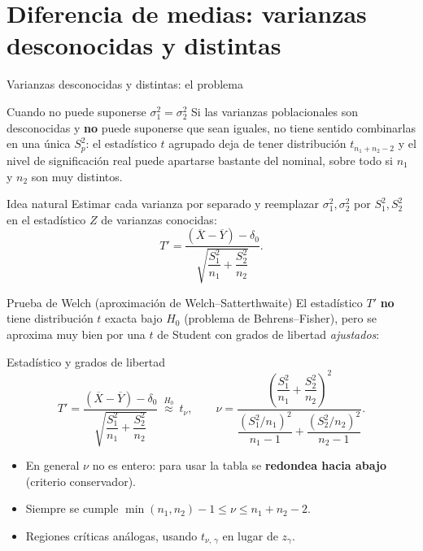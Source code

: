 \documentclass[aspectratio=169,11pt]{beamer}
\begin{document}
\section{Diferencia de medias: varianzas desconocidas y distintas}

\begin{frame}{Varianzas desconocidas y distintas: el problema}
\begin{alertblock}{Cuando no puede suponerse $\sigma_1^2=\sigma_2^2$}
Si las varianzas poblacionales son desconocidas y \textbf{no} puede suponerse que sean iguales, no tiene sentido combinarlas en una única $S_p^2$: el estadístico $t$ agrupado deja de tener distribución $t_{n_1+n_2-2}$ y el nivel de significación real puede apartarse bastante del nominal, sobre todo si $n_1$ y $n_2$ son muy distintos.
\end{alertblock}

\begin{block}{Idea natural}
Estimar cada varianza por separado y reemplazar $\sigma_1^2,\sigma_2^2$ por $S_1^2,S_2^2$ en el estadístico $Z$ de varianzas conocidas:
\[
T'=\frac{(\overline{X}-\overline{Y})-\delta_0}{\sqrt{\dfrac{S_1^2}{n_1}+\dfrac{S_2^2}{n_2}}}.
\]
\end{block}
\end{frame}

\begin{frame}{Prueba de Welch (aproximación de Welch--Satterthwaite)}
El estadístico $T'$ \textbf{no} tiene distribución $t$ exacta bajo $H_0$ (problema de Behrens--Fisher), pero se aproxima muy bien por una $t$ de Student con grados de libertad \emph{ajustados}:

\begin{block}{Estadístico y grados de libertad}
\[
T'=\frac{(\overline{X}-\overline{Y})-\delta_0}{\sqrt{\dfrac{S_1^2}{n_1}+\dfrac{S_2^2}{n_2}}} \ \overset{H_0}{\approx}\ t_{\nu},
\qquad
\nu=\frac{\left(\dfrac{S_1^2}{n_1}+\dfrac{S_2^2}{n_2}\right)^{2}}{\dfrac{(S_1^2/n_1)^2}{n_1-1}+\dfrac{(S_2^2/n_2)^2}{n_2-1}}.
\]
\end{block}

\begin{itemize}
\item En general $\nu$ no es entero: para usar la tabla se \textbf{redondea hacia abajo} (criterio conservador).
\item Siempre se cumple $\min(n_1,n_2)-1\le\nu\le n_1+n_2-2$.
\item Regiones críticas análogas, usando $t_{\nu,\,\gamma}$ en lugar de $z_\gamma$.
\end{itemize}
\end{frame}
\end{document}
